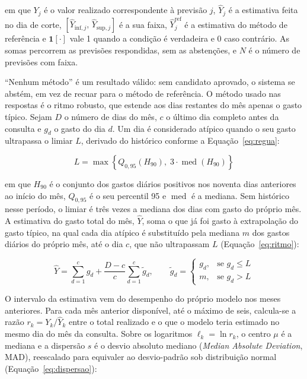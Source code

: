 \noindent em que $Y_j$ é o valor realizado correspondente à previsão $j$, $\hat{Y}_j$ é a estimativa feita no dia de corte, $\left[\hat{Y}_{\mathrm{inf},j},\, \hat{Y}_{\mathrm{sup},j}\right]$ é a sua faixa, $\hat{Y}^{\mathrm{ref}}_j$ é a estimativa do método de referência e $\mathbf{1}[\cdot]$ vale 1 quando a condição é verdadeira e 0 caso contrário. As somas percorrem as previsões respondidas, sem as abstenções, e $N$ é o número de previsões com faixa.

``Nenhum método'' é um resultado válido: sem candidato aprovado, o sistema se abstém, em vez de recuar para o método de referência. O método usado nas respostas é o ritmo robusto, que estende aos dias restantes do mês apenas o gasto típico. Sejam $D$ o número de dias do mês, $c$ o último dia completo antes da consulta e $g_d$ o gasto do dia $d$. Um dia é considerado atípico quando o seu gasto ultrapassa o limiar $L$, derivado do histórico conforme a Equação~\ref{eq:regua}:

\begin{equation}
L = \max\left\{ Q_{0{,}95}\left(H_{90}\right),\; 3 \cdot \operatorname{med}\left(H_{90}\right) \right\}
\label{eq:regua}
\end{equation}

\noindent em que $H_{90}$ é o conjunto dos gastos diários positivos nos noventa dias anteriores ao início do mês, $Q_{0{,}95}$ é o seu percentil 95 e $\operatorname{med}$ é a mediana. Sem histórico nesse período, o limiar é três vezes a mediana dos dias com gasto do próprio mês. A estimativa do gasto total do mês, $\hat{Y}$, soma o que já foi gasto à extrapolação do gasto típico, na qual cada dia atípico é substituído pela mediana $m$ dos gastos diários do próprio mês, até o dia $c$, que não ultrapassam $L$ (Equação~\ref{eq:ritmo}):

\begin{equation}
\hat{Y} = \sum_{d=1}^{c} g_d + \frac{D - c}{c} \sum_{d=1}^{c} \tilde{g}_d,
\qquad
\tilde{g}_d =
\begin{cases}
g_d, & \text{se } g_d \le L \\
m, & \text{se } g_d > L
\end{cases}
\label{eq:ritmo}
\end{equation}

O intervalo da estimativa vem do desempenho do próprio modelo nos meses anteriores. Para cada mês anterior disponível, até o máximo de seis, calcula-se a razão $r_k = Y_k / \hat{Y}_k$ entre o total realizado e o que o modelo teria estimado no mesmo dia do mês da consulta. Sobre os logaritmos $\ell_k = \ln r_k$, o centro $\mu$ é a mediana e a dispersão $s$ é o desvio absoluto mediano (\textit{Median Absolute Deviation}, MAD), reescalado para equivaler ao desvio-padrão sob distribuição normal (Equação~\ref{eq:dispersao}):

